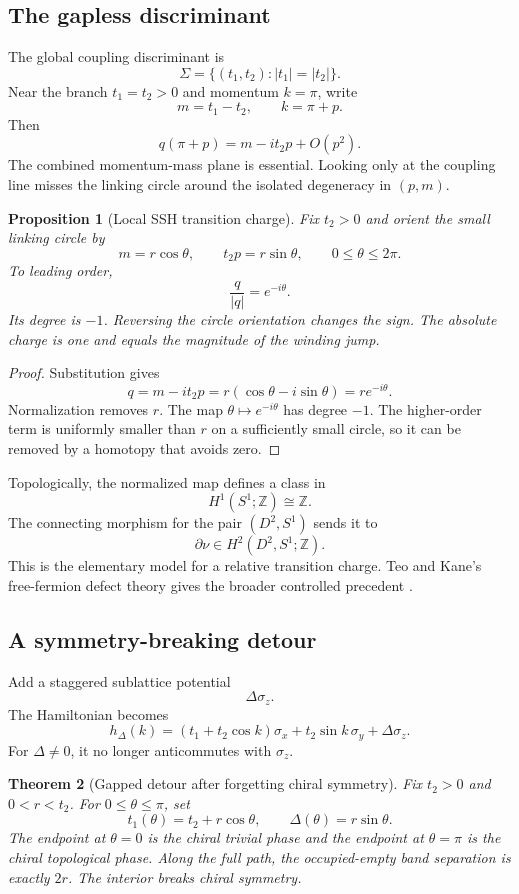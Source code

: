 \documentclass[12pt]{article}
\newtheorem{theorem}{Theorem}[section]
\newtheorem{proposition}[theorem]{Proposition}
\theoremstyle{definition}
\theoremstyle{remark}
\newcommand{\Z}{\mathbb Z}
\begin{document}
\subsection{The gapless discriminant}

The global coupling discriminant is
\[
\Sigma
=
\{(t_1,t_2):|t_1|=|t_2|\}.
\]
Near the branch $t_1=t_2>0$ and momentum $k=\pi$, write
\[
m=t_1-t_2,
\qquad
k=\pi+p.
\]
Then
\[
q(\pi+p)
=
m-it_2p+O(p^2).
\]
The combined momentum-mass plane is essential.
Looking only at the coupling line misses the linking circle around the
isolated degeneracy in $(p,m)$.

\begin{proposition}[Local SSH transition charge]
\label{prop:ssh-charge}
Fix $t_2>0$ and orient the small linking circle by
\[
m=r\cos\theta,
\qquad
t_2p=r\sin\theta,
\qquad
0\leq\theta\leq2\pi.
\]
To leading order,
\[
\frac{q}{|q|}=e^{-i\theta}.
\]
Its degree is $-1$.
Reversing the circle orientation changes the sign.
The absolute charge is one and equals the magnitude of the winding jump.
\end{proposition}

\begin{proof}
Substitution gives
\[
q=m-it_2p
=
r(\cos\theta-i\sin\theta)
=
re^{-i\theta}.
\]
Normalization removes $r$.
The map $\theta\mapsto e^{-i\theta}$ has degree $-1$.
The higher-order term is uniformly smaller than $r$ on a sufficiently small
circle, so it can be removed by a homotopy that avoids zero.
\end{proof}

Topologically, the normalized map defines a class in
\[
H^1(S^1;\Z)\cong\Z.
\]
The connecting morphism for the pair $(D^2,S^1)$ sends it to
\[
\partial\nu
\in
H^2(D^2,S^1;\Z).
\]
This is the elementary model for a relative transition charge.
Teo and Kane's free-fermion defect theory gives the broader controlled
precedent \cite{TeoKane2010}.

\subsection{A symmetry-breaking detour}

Add a staggered sublattice potential
\[
\Delta\sigma_z.
\]
The Hamiltonian becomes
\[
h_{\Delta}(k)
=
(t_1+t_2\cos k)\sigma_x
+t_2\sin k\,\sigma_y
+\Delta\sigma_z.
\]
For $\Delta\neq0$, it no longer anticommutes with $\sigma_z$.

\begin{theorem}[Gapped detour after forgetting chiral symmetry]
\label{thm:ssh-detour}
Fix $t_2>0$ and $0<r<t_2$.
For $0\leq\theta\leq\pi$, set
\[
t_1(\theta)=t_2+r\cos\theta,
\qquad
\Delta(\theta)=r\sin\theta.
\]
The endpoint at $\theta=0$ is the chiral trivial phase and the endpoint at
$\theta=\pi$ is the chiral topological phase.
Along the full path, the occupied-empty band separation is exactly $2r$.
The interior breaks chiral symmetry.
\end{theorem}
\end{document}
